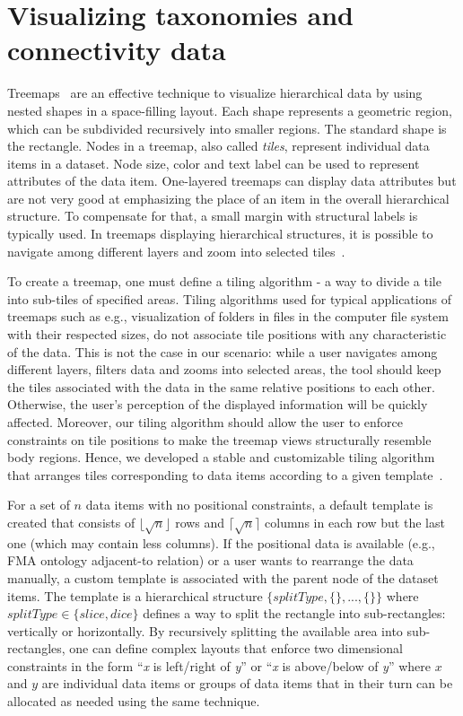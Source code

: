 \section{Visualizing taxonomies and connectivity data}
\label{sect:visualization}

Treemaps~\cite{JS91} are an effective technique to visualize hierarchical data by using nested shapes in a space-filling layout.
Each shape represents a geometric region, which can be subdivided recursively into smaller regions. The standard shape is the rectangle.
Nodes in a treemap, also called \emph{tiles}, represent individual data items in a dataset. Node size, color and text label can be used to represent attributes of the data item. One-layered treemaps can display data attributes but are not very good at emphasizing the place of an item in the overall hierarchical structure. To compensate for that, a small margin with structural labels is typically used. In treemaps displaying hierarchical structures, it is possible to navigate among different layers and zoom into selected tiles~\cite{BL07}.

To create a treemap, one must define a tiling algorithm - a way to divide a tile into sub-tiles of specified areas.
Tiling algorithms used for typical applications of treemaps such as e.g., visualization of folders in files in the computer file system with their respected sizes, do not associate tile positions with any characteristic of the data. This is not the case in our scenario: while a user navigates among different layers, filters data and zooms into selected areas, the tool should keep the tiles associated with the data in the same relative positions to each other. Otherwise, the user's perception of the displayed information will be quickly affected. Moreover, our tiling algorithm should allow the user to enforce constraints on tile positions to make the treemap views structurally resemble body regions. Hence, we developed a stable and customizable tiling algorithm that arranges tiles corresponding to data items according to a given template~\cite{KBK14}.

For a set of $n$ data items with no positional constraints, a default template is created that consists of $\lfloor \sqrt{n} \rfloor$ rows and $\lceil \sqrt{n} \rceil$ columns in each row but the last one (which may contain less columns). If the positional data is available (e.g., FMA ontology adjacent-to relation) or a user wants to rearrange the data manually, a custom template is associated with the parent node of the dataset items. The template is a hierarchical structure
$\{splitType, \{\},..., \{\}\}$ where $splitType \in \{slice, dice\}$ defines a way to split the rectangle into sub-rectangles: vertically or horizontally. By recursively splitting the available area into sub-rectangles, one can define complex layouts that enforce two dimensional constraints in the form ``\emph{x} is left/right of \emph{y}'' or ``\emph{x} is above/below of \emph{y}'' where $x$ and $y$ are individual data items or groups of data items that in their turn can be allocated as needed using the same technique.

